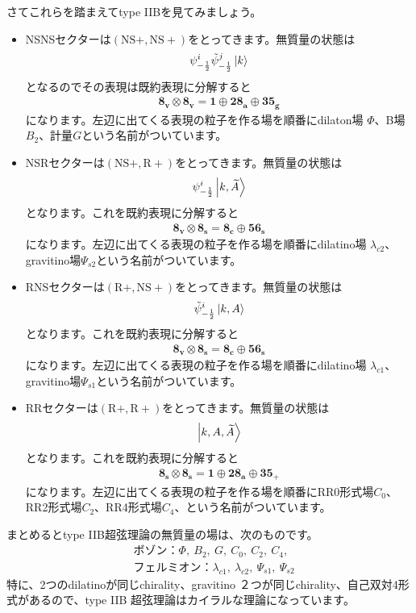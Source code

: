 \documentclass[report,paper=a4, fontsize=12pt, line_length=16cm, number_of_lines=33,dvipdfmx]{jlreq}
\numberwithin{equation}{chapter}
\numberwithin{equation}{section}
\newcommand{\At}{\widetilde{A}}
\newcommand{\psit}{\tilde{\psi}}
\newcommand{\NSp}{\mathrm{NS}+}
\newcommand{\Rp}{\mathrm{R}+}
\newcommand{\triv}{\mathbf{1}}
\newcommand{\etv}{\mathbf{8_v}}
\newcommand{\ets}{\mathbf{8_s}}
\newcommand{\etc}{\mathbf{8_c}}
\newcommand{\tweta}{\mathbf{28_{a}}}
\newcommand{\thfvg}{\mathbf{35_{g}}}
\newcommand{\thfvp}{\mathbf{35}_{+}}
\newcommand{\fsxs}{\mathbf{56_s}}
\begin{document}
さてこれらを踏まえてtype IIBを見てみましょう。
\begin{itemize}
  \item NSNSセクターは$(\NSp,\NSp)$をとってきます。無質量の状態は
  \begin{align}
    \psi_{-\frac12}^{i}\psit_{-\frac12}^{j}\ket{k}
  \end{align}
  となるのでその表現は既約表現に分解すると
  \begin{align}
    \etv\otimes\etv= \triv \oplus \tweta\oplus \thfvg
  \end{align}
  になります。左辺に出てくる表現の粒子を作る場を順番にdilaton場 $\Phi$、B場$B_2$、計量$G$という名前がついています。
  \item NSRセクターは$(\NSp,\Rp)$をとってきます。無質量の状態は
  \begin{align}
    \psi_{-\frac12}^{i}\ket{k,\At}
  \end{align}
  となります。これを既約表現に分解すると
  \begin{align}
    \etv\otimes\ets= \etc \oplus \fsxs
  \end{align}
  になります。左辺に出てくる表現の粒子を作る場を順番にdilatino場 $\lambda_{c2}$、gravitino場$\Psi_{s2}$という名前がついています。
  \item RNSセクターは$(\Rp,\NSp)$をとってきます。無質量の状態は
  \begin{align}
    \psit_{-\frac12}^{i}\ket{k,A}
  \end{align}
  となります。これを既約表現に分解すると
  \begin{align}
    \etv\otimes\ets= \etc \oplus \fsxs
  \end{align}
  になります。左辺に出てくる表現の粒子を作る場を順番にdilatino場 $\lambda_{c1}$、gravitino場$\Psi_{s1}$という名前がついています。
  \item RRセクターは$(\Rp,\Rp)$をとってきます。無質量の状態は
  \begin{align}
    \ket{k,A,\At}
  \end{align}
  となります。これを既約表現に分解すると
  \begin{align}
    \ets\otimes\ets= \triv\oplus \tweta \oplus \thfvp
  \end{align}
  になります。左辺に出てくる表現の粒子を作る場を順番にRR0形式場$C_0$、RR2形式場$C_2$、RR4形式場$C_4$、という名前がついています。
\end{itemize}
まとめるとtype IIB超弦理論の無質量の場は、次のものです。
\begin{align}
  &\text{ボゾン：}\Phi,\ B_2,\ G,\ C_0,\ C_2,\ C_4,\\
  &\text{フェルミオン：} \lambda_{c1},\ \lambda_{c2},\ \Psi_{s1},\ \Psi_{s2}
\end{align}
特に、2つのdilatinoが同じchirality、gravitino ２つが同じchirality、自己双対4形式があるので、type IIB 超弦理論はカイラルな理論になっています。
\end{document}
